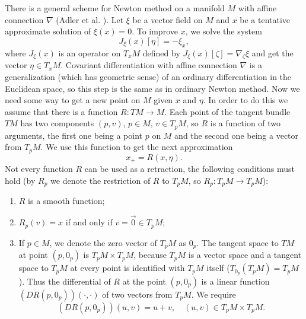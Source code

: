 There is a general scheme for Newton method on a manifold $M$ with affine connection $\nabla$ (Adler et al. \cite{adler_spine}).
Let $\xi$ be a vector field on $M$ and $x$ be a tentative approximate
solution of $\xi(x) = 0$. To improve $x$, we solve the system 
\begin{equation}
    J_{\xi}(x)[\eta] = - \xi_x,
\end{equation}
where $J_{\xi}(x)$ is an operator on $T_xM$ defined by $J_{\xi}(x)[\zeta] = \nabla_{\zeta} \xi$
and get the vector $\eta \in T_xM$. Covariant differentiation with 
affine connection $\nabla$ is a generalization (which has geometric sense) of
an ordinary differentiation in the Euclidean space, so this step is the 
same as in ordinary Newton method. Now we need some way to get 
a new point on $M$ given $x$ and $\eta$. In order to do this we assume
that there is a function $R \colon TM \to M$. Each point of the tangent bundle $TM$
has two components $(p, v)$, $p \in M$, $v \in T_pM$, so $R$ is a function
of two arguments, the first one being a point $p$ on $M$
and the second one being a vector from $T_pM$. We use this function
to get the next approximation
\begin{equation}
    x_{+} = R(x, \eta).
\end{equation}
Not every function $R$ can be used as a retraction, the following 
conditions must hold (by $R_p$ we denote the restriction of $R$ to $T_pM$,  so $R_p \colon T_pM \to T_pM$):
\begin{enumerate}
    \item $R$ is a smooth function;
    \item $R_p(v) = x$ if and only if $v = \vec{0} \in T_pM$;

    \item If $p \in M$, we denote the zero vector of $T_pM$ as $0_p$. The tangent space to $TM$ at point $(p, 0_p)$
        is $T_pM \times T_pM$, because $T_pM$ is a vector space and a tangent space to $T_pM$
        at every point is identified with $T_pM$ itself ($T_{0_p}(T_pM) = T_pM$). Thus the
        differential of $R$ at the point $(p, 0_p)$ is a linear function $(DR(p, 0_p))(\cdot, \cdot)$
        of two vectors from $T_pM$. We require
        \begin{equation}
          (DR(p, 0_p))(u, v) = u + v, \quad (u, v) \in T_pM \times T_pM.
        \end{equation}
\end{enumerate}

